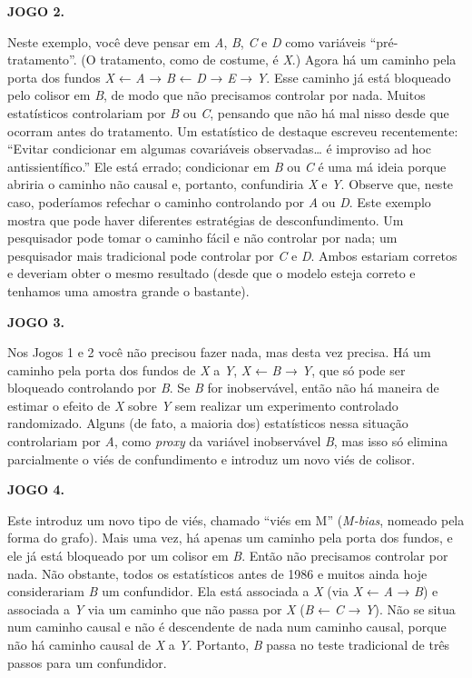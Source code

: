 \documentclass[11pt,a5paper,twoside]{book}
\begin{document}
\textbf{JOGO 2.}

Neste exemplo, você deve pensar em \textit{A}, \textit{B}, \textit{C} e \textit{D} como variáveis “pré-tratamento”. (O tratamento, como de costume, é \textit{X}.) Agora há um caminho pela porta dos fundos \textit{X} ← \textit{A} → \textit{B} ← \textit{D} → \textit{E} → \textit{Y}. Esse caminho já está bloqueado pelo colisor em \textit{B}, de modo que não precisamos controlar por nada. Muitos estatísticos controlariam por \textit{B} ou \textit{C}, pensando que não há mal nisso desde que ocorram antes do tratamento. Um estatístico de destaque escreveu recentemente: “Evitar condicionar em algumas covariáveis observadas… é improviso ad hoc antissientífico.” Ele está errado; condicionar em \textit{B} ou \textit{C} é uma má ideia porque abriria o caminho não causal e, portanto, confundiria \textit{X} e \textit{Y}. Observe que, neste caso, poderíamos refechar o caminho controlando por \textit{A} ou \textit{D}. Este exemplo mostra que pode haver diferentes estratégias de desconfundimento. Um pesquisador pode tomar o caminho fácil e não controlar por nada; um pesquisador mais tradicional pode controlar por \textit{C} e \textit{D}. Ambos estariam corretos e deveriam obter o mesmo resultado (desde que o modelo esteja correto e tenhamos uma amostra grande o bastante).

\textbf{JOGO 3.}

Nos Jogos 1 e 2 você não precisou fazer nada, mas desta vez precisa. Há um caminho pela porta dos fundos de \textit{X} a \textit{Y}, \textit{X} ← \textit{B} → \textit{Y}, que só pode ser bloqueado controlando por \textit{B}. Se \textit{B} for inobservável, então não há maneira de estimar o efeito de \textit{X} sobre \textit{Y} sem realizar um experimento controlado randomizado. Alguns (de fato, a maioria dos) estatísticos nessa situação controlariam por \textit{A}, como \textit{proxy} da variável inobservável \textit{B}, mas isso só elimina parcialmente o viés de confundimento e introduz um novo viés de colisor.

\textbf{JOGO 4.}

Este introduz um novo tipo de viés, chamado “viés em M” (\textit{M-bias}, nomeado pela forma do grafo). Mais uma vez, há apenas um caminho pela porta dos fundos, e ele já está bloqueado por um colisor em \textit{B}. Então não precisamos controlar por nada. Não obstante, todos os estatísticos antes de 1986 e muitos ainda hoje considerariam \textit{B} um confundidor. Ela está associada a \textit{X} (via \textit{X} ← \textit{A} → \textit{B}) e associada a \textit{Y} via um caminho que não passa por \textit{X} (\textit{B} ← \textit{C} → \textit{Y}). Não se situa num caminho causal e não é descendente de nada num caminho causal, porque não há caminho causal de \textit{X} a \textit{Y}. Portanto, \textit{B} passa no teste tradicional de três passos para um confundidor.
\end{document}

